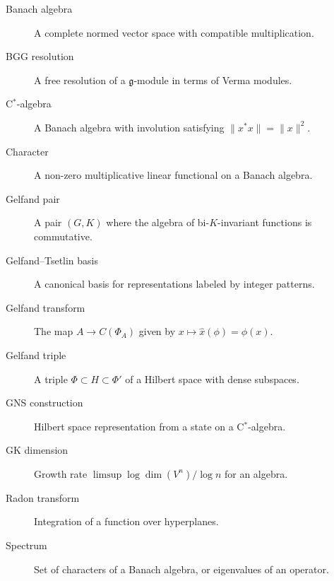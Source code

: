 \begin{description}
    \item[Banach algebra] A complete normed vector space with compatible multiplication.
    \item[BGG resolution] A free resolution of a $\mathfrak{g}$-module in terms of Verma modules.
    \item[C$^*$-algebra] A Banach algebra with involution satisfying $\|x^* x\| = \|x\|^2$.
    \item[Character] A non-zero multiplicative linear functional on a Banach algebra.
    \item[Gelfand pair] A pair $(G,K)$ where the algebra of bi-$K$-invariant functions is commutative.
    \item[Gelfand--Tsetlin basis] A canonical basis for representations labeled by integer patterns.
    \item[Gelfand transform] The map $A \to C(\Phi_A)$ given by $x \mapsto \hat{x}(\phi) = \phi(x)$.
    \item[Gelfand triple] A triple $\Phi \subset H \subset \Phi'$ of a Hilbert space with dense subspaces.
    \item[GNS construction] Hilbert space representation from a state on a C$^*$-algebra.
    \item[GK dimension] Growth rate $\limsup \log\dim(V^n)/\log n$ for an algebra.
    \item[Radon transform] Integration of a function over hyperplanes.
    \item[Spectrum] Set of characters of a Banach algebra, or eigenvalues of an operator.
\end{description}

